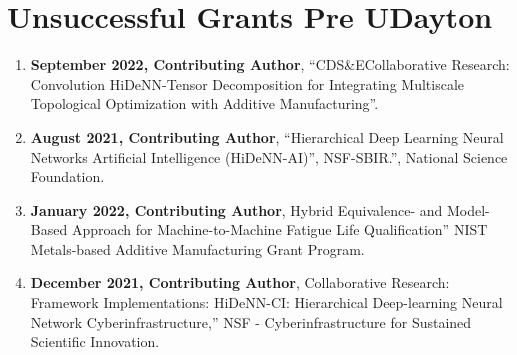 \documentclass[11pt, letterpaper]{article}
\begin{document}
\section{Unsuccessful Grants Pre UDayton}
    \begin{enumerate}[label=\arabic*., itemsep=-1pt, topsep=2pt]    
        \item \textbf{September 2022, Contributing Author}, “CDS\&E\/Collaborative Research: Convolution HiDeNN-Tensor Decomposition for Integrating Multiscale Topological Optimization with Additive Manufacturing”.
        \item \textbf{August 2021, Contributing Author}, “Hierarchical Deep Learning Neural Networks Artificial Intelligence (HiDeNN-AI)”, NSF-SBIR.”, National Science Foundation.
        \item \textbf{January 2022, Contributing Author}, Hybrid Equivalence- and Model-Based Approach for Machine-to-Machine Fatigue Life Qualification” NIST Metals-based Additive Manufacturing Grant Program. 
        \item \textbf{December 2021, Contributing Author}, Collaborative Research: Framework Implementations: HiDeNN-CI: Hierarchical Deep-learning Neural Network Cyberinfrastructure,” NSF - Cyberinfrastructure for Sustained Scientific Innovation.
    \end{enumerate}
\fi

    
\end{document}
